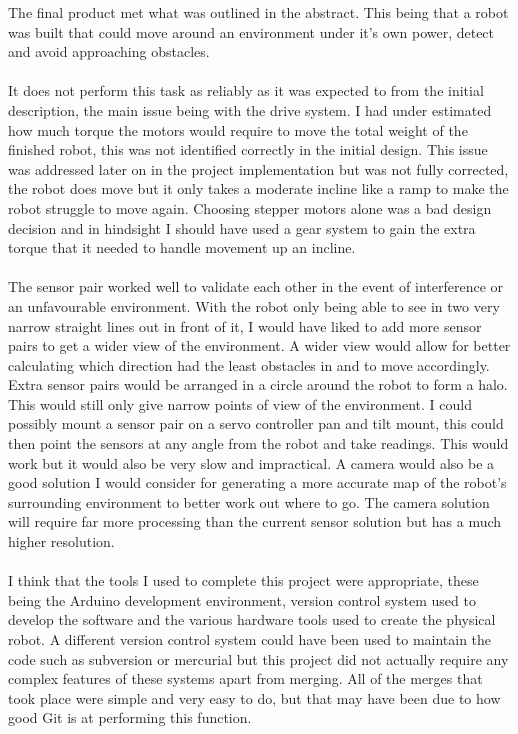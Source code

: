 The final product met what was outlined in the abstract.  This being that a robot was built that could move around an environment under it's own power, detect and avoid approaching obstacles.
\\\\It does not perform this task as reliably as it was expected to from the initial description, the main issue being with the drive system.  I had under estimated how much torque the motors would require to move the total weight of the finished robot, this was not identified correctly in the initial design.  This issue was addressed later on in the project implementation but was not fully corrected, the robot does move but it only takes a moderate incline like a ramp to make the robot struggle to move again.  Choosing stepper motors alone was a bad design decision and in hindsight I should have used a gear system to gain the extra torque that it needed to handle movement up an incline.
\\\\The sensor pair worked well to validate each other in the event of interference or an unfavourable environment.  With the robot only being able to see in two very narrow straight lines out in front of it, I would have liked to add more sensor pairs to get a wider view of the environment.  A wider view would allow for better calculating which direction had the least obstacles in and to move accordingly.
\\Extra sensor pairs would be arranged in a circle around the robot to form a halo.  This would still only give narrow points of view of the environment.  I could possibly mount a sensor pair on a servo controller pan and tilt mount, this could then point the sensors at any angle from the robot and take readings.  This would work but it would also be very slow and impractical.  A camera would also be a good solution I would consider for generating a more accurate map of the robot's surrounding environment to better work out where to go.  The camera solution will require far more processing than the current sensor solution but has a much higher resolution.
\\\\I think that the tools I used to complete this project were appropriate, these being the Arduino development environment, version control system used to develop the software and the various hardware tools used to create the physical robot.  A different version control system could have been used to maintain the code such as subversion or mercurial but this project did not actually require any complex features of these systems apart from merging.  All of the merges that took place were simple and very easy to do, but that may have been due to how good Git is at performing this function.
